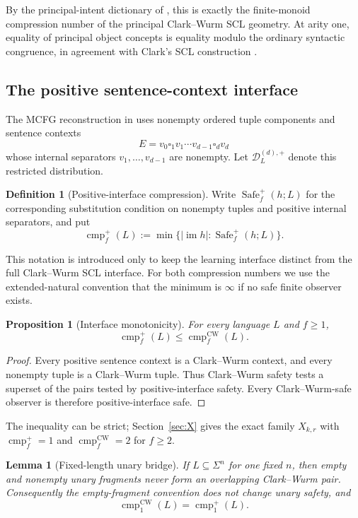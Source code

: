 \documentclass[11pt]{article}
\newtheorem{proposition}[theorem]{Proposition}
\newtheorem{lemma}[theorem]{Lemma}
\theoremstyle{definition}
\newtheorem{definition}[theorem]{Definition}
\theoremstyle{remark}
\newcommand{\D}{\mathcal D}
\newcommand{\im}{\operatorname{im}}
\newcommand{\cmp}{\operatorname{cmp}}
\newcommand{\Safe}{\operatorname{Safe}}
\newcommand{\blank}{\square}
\begin{document}
By the principal-intent dictionary of \cite{KuriyamaSCL}, this is exactly the
finite-monoid compression number of the principal Clark--Wurm SCL geometry.
At arity one, equality of principal object concepts is equality modulo the
ordinary syntactic congruence, in agreement with Clark's SCL construction
\cite{Clark2013}.

\subsection{The positive sentence-context interface}

The MCFG reconstruction in \cite{KuriyamaMCFG,KuriyamaOFET} uses nonempty
ordered tuple components and sentence contexts
\[
 E=v_0\blank_1v_1\cdots v_{d-1}\blank_dv_d
\]
whose internal separators $v_1,\ldots,v_{d-1}$ are nonempty.  Let
$\D_L^{(d),+}$ denote this restricted distribution.

\begin{definition}[Positive-interface compression]
Write $\Safe_f^+(h;L)$ for the corresponding substitution condition on
nonempty tuples and positive internal separators, and put
\[
 \cmp_f^+(L)
 :=
 \min\{|\im h|:\Safe_f^+(h;L)\}.
\]
\end{definition}

This notation is introduced only to keep the learning interface distinct from
the full Clark--Wurm SCL interface.  For both compression numbers we use the
extended-natural convention that the minimum is $\infty$ if no safe finite
observer exists.

\begin{proposition}[Interface monotonicity]
\label{prop:interface-monotonicity}
For every language $L$ and $f\ge1$,
\[
 \cmp_f^+(L)\le \cmp_f^{\mathrm{CW}}(L).
\]
\end{proposition}

\begin{proof}
Every positive sentence context is a Clark--Wurm context, and every nonempty
tuple is a Clark--Wurm tuple.  Thus Clark--Wurm safety tests a superset of the
pairs tested by positive-interface safety.  Every Clark--Wurm-safe observer is
therefore positive-interface safe.
\end{proof}

The inequality can be strict; Section~\ref{sec:X} gives the exact family
$X_{k,r}$ with $\cmp_f^+=1$ and $\cmp_f^{\mathrm{CW}}=2$ for $f\ge2$.

\begin{lemma}[Fixed-length unary bridge]
\label{lem:fixed-length-bridge}
If $L\subseteq\Sigma^n$ for one fixed $n$, then empty and nonempty unary
fragments never form an overlapping Clark--Wurm pair.  Consequently the
empty-fragment convention does not change unary safety, and
\[
 \cmp_1^{\mathrm{CW}}(L)=\cmp_1^+(L).
\]
\end{lemma}
\end{document}
